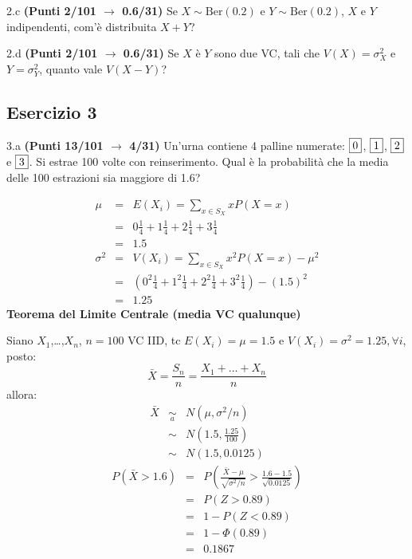 \documentclass[
  11pt,
]{book}
\theoremstyle{mytheoremstyle}
\theoremstyle{mydefstyle}
\newenvironment{sol}
  {
  \begin{tcolorbox}[enhanced,breakable,arc=0.1mm,boxrule=1pt,colback=white,colframe=iblue,
  title=\bf \fontfamily{lmss}\selectfont \hspace{.5 cm} Soluzione,drop fuzzy shadow]

}{
\end{tcolorbox}
  }
\begin{document}
2.c \textbf{(Punti 2/101 \(\rightarrow\) 0.6/31)} Se \(X\sim\text{Ber}(0.2)\) e \(Y\sim\text{Ber}(0.2)\), \(X\) e \(Y\) indipendenti, com'è distribuita \(X+Y\)?

2.d \textbf{(Punti 2/101 \(\rightarrow\) 0.6/31)} Se \(X\) è \(Y\) sono due VC, tali che \(V(X)=\sigma_X^2\) e \(Y=\sigma_Y^2\), quanto vale \(V(X-Y)\)?

\subsection{Esercizio 3}\label{esercizio-3-21}

3.a \textbf{(Punti 13/101 \(\rightarrow\) 4/31)} Un'urna contiene 4 palline numerate: \(\fbox{0}\), \(\fbox{1}\), \(\fbox{2}\) e \(\fbox{3}\). Si estrae 100 volte con reinserimento. Qual è la probabilità che la media delle 100 estrazioni sia maggiore di 1.6?

\begin{sol}
\begin{eqnarray*} \mu &=& E(X_i) = \sum_{x\in S_X}x P(X=x)\\ 
 &=&  0  \frac { 1 }{ 4 }+ 1  \frac { 1 }{ 4 }+ 2  \frac { 1 }{ 4 }+ 3  \frac { 1 }{ 4 } \\ 
            &=& 1.5 \\ 
 \sigma^2 &=& V(X_i) = \sum_{x\in S_X}x^2 P(X=x)-\mu^2\\ 
 &=&\left(  0  ^2\frac { 1 }{ 4 }+ 1  ^2\frac { 1 }{ 4 }+ 2  ^2\frac { 1 }{ 4 }+ 3  ^2\frac { 1 }{ 4 } \right)-( 1.5 )^2\\ 
            &=& 1.25 
\end{eqnarray*}
\textbf{Teorema del Limite Centrale (media VC qualunque)}

Siano \(X_1\),\ldots,\(X_n\), \(n=100\) VC IID, tc \(E(X_i)=\mu=1.5\) e \(V(X_i)=\sigma^2=1.25,\forall i\), posto:
\[
      \bar X=\frac{S_n}n =\frac{X_1 + ... + X_n}n
      \]
allora:\begin{eqnarray*}
  \bar X & \mathop{\sim}\limits_{a}& N(\mu,\sigma^2/n) \\
     &\sim & N\left(1.5,\frac{1.25}{100}\right) \\
     &\sim & N(1.5,0.0125)
  \end{eqnarray*}\begin{eqnarray*}
      P( \bar X   >   1.6 ) 
        &=& P\left(  \frac { \bar X  -  \mu }{ \sqrt{\sigma^2/n} }  >  \frac { 1.6  -  1.5 }{\sqrt{ 0.0125 }} \right)  \\
                 &=& P\left(  Z   >   0.89 \right) \\    &=& 1-P(Z< 0.89 )\\ 
                 &=&  1-\Phi( 0.89 ) \\ &=&  0.1867 
      \end{eqnarray*}

\end{sol}
\end{document}
